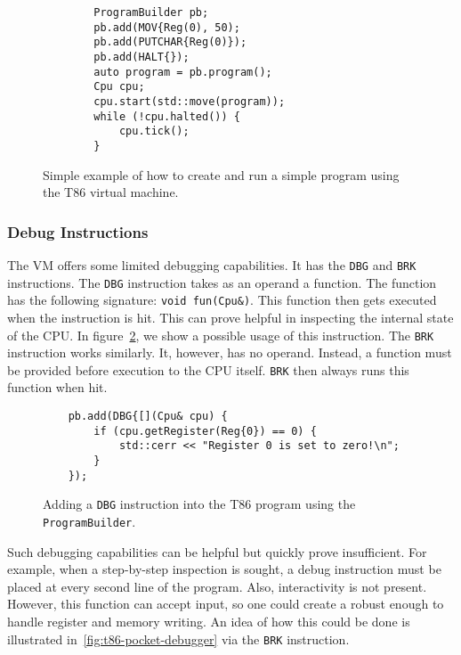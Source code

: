 \begin{figure}
    \begin{verbatim}
        ProgramBuilder pb;
        pb.add(MOV{Reg(0), 50);
        pb.add(PUTCHAR{Reg(0)});
        pb.add(HALT{});
        auto program = pb.program();
        Cpu cpu;
        cpu.start(std::move(program));
        while (!cpu.halted()) {
            cpu.tick();
        }
    \end{verbatim}
    \caption{Simple example of how to create and run a simple program using the
    T86 virtual machine.}
    \label{fig:t86-intro}
\end{figure}

\subsubsection{Debug Instructions}\label{section:t86-debug-cap}
The VM offers some limited debugging capabilities. It has the \texttt{DBG} and
\texttt{BRK} instructions. The \texttt{DBG} instruction takes as an operand a
function. The function has the following signature: \texttt{void fun(Cpu\&)}.
This function then gets executed when the instruction is hit. This can prove
helpful in inspecting the internal state of the CPU. In
figure~\ref{fig:t86-debug}, we show a possible usage of this instruction. The
\texttt{BRK} instruction works similarly. It, however, has no operand. Instead,
a function must be provided before execution to the CPU itself. \texttt{BRK}
then always runs this function when hit.

\begin{figure}
    \begin{verbatim}
    pb.add(DBG{[](Cpu& cpu) {
        if (cpu.getRegister(Reg{0}) == 0) {
            std::cerr << "Register 0 is set to zero!\n";
        }
    });
    \end{verbatim}
    \caption{Adding a \texttt{DBG} instruction into the T86 program using the
    \texttt{ProgramBuilder}.}
    \label{fig:t86-debug}
\end{figure}

Such debugging capabilities can be helpful but quickly prove insufficient. For
example, when a step-by-step inspection is sought, a debug instruction must be
placed at every second line of the program. Also, interactivity is not present.
However, this function can accept input, so one could create a robust enough to
handle register and memory writing. An idea of how this could be done is
illustrated in~\ref{fig:t86-pocket-debugger} via the \texttt{BRK} instruction.

